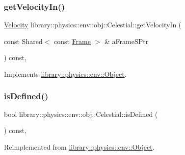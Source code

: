 \subsubsection{\texorpdfstring{get\+Velocity\+In()}{getVelocityIn()}}
{\footnotesize\ttfamily \hyperlink{classlibrary_1_1physics_1_1coord_1_1_velocity}{Velocity} library\+::physics\+::env\+::obj\+::\+Celestial\+::get\+Velocity\+In (\begin{DoxyParamCaption}\item[{const Shared$<$ const \hyperlink{classlibrary_1_1physics_1_1coord_1_1_frame}{Frame} $>$ \&}]{a\+Frame\+S\+Ptr }\end{DoxyParamCaption}) const\hspace{0.3cm}{\ttfamily [override]}, {\ttfamily [virtual]}}



Implements \hyperlink{classlibrary_1_1physics_1_1env_1_1_object_a1a8f4358db37b1b8830866373f8f3670}{library\+::physics\+::env\+::\+Object}.

\mbox{\label{classlibrary_1_1physics_1_1env_1_1obj_1_1_celestial_a2b16a76f609891450356457de13c26d8}} 
\subsubsection{\texorpdfstring{is\+Defined()}{isDefined()}}
{\footnotesize\ttfamily bool library\+::physics\+::env\+::obj\+::\+Celestial\+::is\+Defined (\begin{DoxyParamCaption}{ }\end{DoxyParamCaption}) const\hspace{0.3cm}{\ttfamily [override]}, {\ttfamily [virtual]}}



Reimplemented from \hyperlink{classlibrary_1_1physics_1_1env_1_1_object_a7035edc921681401ddd43b094645a024}{library\+::physics\+::env\+::\+Object}.

\mbox{\label{classlibrary_1_1physics_1_1env_1_1obj_1_1_celestial_a020864aa551a1ec6f5674cc2e166b131}} 
